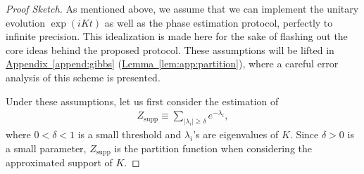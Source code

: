 \documentclass[a4paper,UKenglish,cleveref, autoref]{lipics-v2019}
\theoremstyle{remark}
\numberwithin{equation}{section}
\numberwithin{oracle}{section}
\numberwithin{remark}{section}
\newcommand{\lem}[1]{\hyperref[lem:#1]{Lemma~\ref*{lem:#1}}}
\newcommand{\append}[1]{\hyperref[append:#1]{Appendix~\ref*{append:#1}}}
\begin{document}
\begin{proof}[Proof Sketch]
As mentioned above, we assume that we can implement the unitary evolution $\exp(iKt)$ as well as the phase estimation protocol, perfectly to infinite precision. This idealization is made here for the sake of flashing out the core ideas behind the proposed protocol. These assumptions will be lifted in \append{gibbs} (\lem{app:partition}), where a careful error analysis of this scheme is presented.

Under these assumptions, let us first consider the estimation of
\begin{align}\label{eqn:Z_supp}
Z_{\text{supp}} \equiv \sum_{|\lambda_i| \ge \delta} e^{-\lambda_i},
\end{align}
where $0<\delta<1$ is a small threshold and $\lambda_i$'s are eigenvalues of $K$. Since $\delta>0$ is a small parameter, $Z_{\text{supp}}$ is the partition function when considering the approximated support of $K$.


\end{proof}
\end{document}
